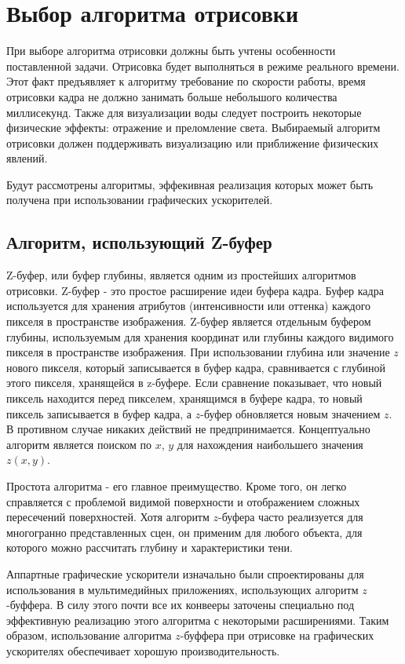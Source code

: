 \section{Выбор алгоритма отрисовки}

При выборе алгоритма отрисовки должны быть учтены особенности поставленной задачи.
Отрисовка будет выполняться в режиме реального времени. Этот факт 
предъявляет к алгоритму требование по скорости работы, время отрисовки кадра не должно занимать
больше небольшого количества миллисекунд. Также для визуализации воды следует построить
некоторые физические эффекты: отражение и преломление света. Выбираемый алгоритм отрисовки
должен поддерживать визуализацию или приближение физических явлений.

Будут рассмотрены алгоритмы, эффекивная реализация которых может быть получена при использовании
графических ускорителей. 

\subsection{Алгоритм, использующий Z-буфер}
Z-буфер, или буфер глубины, является одним из простейших алгоритмов отрисовки.
Z-буфер - это простое расширение идеи буфера кадра. Буфер кадра используется 
для хранения атрибутов (интенсивности или оттенка) каждого пикселя в пространстве изображения. 
Z-буфер является отдельным буфером глубины, используемым для хранения координат или глубины 
каждого видимого пикселя в пространстве изображения. При использовании глубина или значение $z$ нового пикселя, 
который записывается в буфер кадра, сравнивается с глубиной этого пикселя, хранящейся в z-буфере. 
Если сравнение показывает, что новый пиксель находится перед пикселем, хранящимся в буфере кадра, 
то новый пиксель записывается в буфер кадра, а $z$-буфер обновляется новым значением $z$. 
В противном случае никаких действий не предпринимается. Концептуально алгоритм является поиском 
по $x$, $y$ для нахождения наибольшего значения $z(x, y)$.

Простота алгоритма - его главное преимущество. Кроме того, он легко справляется с проблемой видимой 
поверхности и отображением сложных пересечений поверхностей. Хотя алгоритм $z$-буфера часто 
реализуется для многогранно представленных сцен, он применим для любого объекта, для 
которого можно рассчитать глубину и характеристики тени.~\cite{Rodzhers}

Аппартные графические ускорители изначально были спроектированы для использования в мультимедийных
приложениях, использующих алгоритм $z$-буффера. В силу этого почти все их конвееры заточены
специально под эффективную реализацию этого алгоритма с некоторыми расширениями. Таким образом,
использование алгоритма $z$-буффера при отрисовке на графических ускорителях обеспечивает
хорошую производительность.

